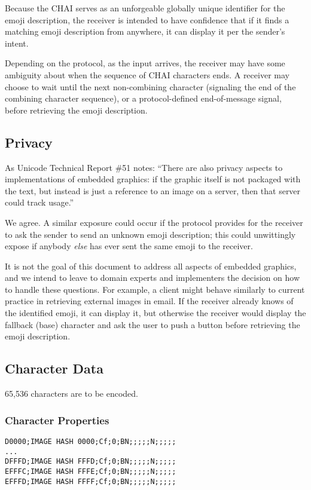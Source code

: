 \documentclass[12pt]{article}
\begin{document}
Because the CHAI serves as an unforgeable globally unique identifier
for the emoji description, the receiver is intended to have confidence
that if it finds a matching emoji description from anywhere, it can
display it per the sender's intent.

Depending on the protocol, as the input arrives, the receiver may have
some ambiguity about when the sequence of CHAI characters ends.  A
receiver may choose to wait until the next non-combining character
(signaling the end of the combining character sequence), or a
protocol-defined end-of-message signal, before retrieving the emoji
description.

\subsection{Privacy}

As Unicode Technical Report \#51 notes: ``There are also privacy
aspects to implementations of embedded graphics: if the graphic itself
is not packaged with the text, but instead is just a reference to an
image on a server, then that server could track usage.''

We agree. A similar exposure could occur if the protocol provides
for the receiver to ask the sender to send an unknown emoji description;
this could unwittingly expose if anybody \emph{else} has ever sent the same
emoji to the receiver.

It is not the goal of this document to address all aspects of embedded
graphics, and we intend to leave to domain experts and implementers
the decision on how to handle these questions. For example, a client
might behave similarly to current practice in retrieving external
images in email. If the receiver already knows of the identified
emoji, it can display it, but otherwise the receiver would display the
fallback (base) character and ask the user to push a button before
retrieving the emoji description.

\subsection{Character Data}

65,536 characters are to be encoded.

\subsubsection{Character Properties}

\begin{verbatim}
D0000;IMAGE HASH 0000;Cf;0;BN;;;;;N;;;;;
...
DFFFD;IMAGE HASH FFFD;Cf;0;BN;;;;;N;;;;;
EFFFC;IMAGE HASH FFFE;Cf;0;BN;;;;;N;;;;;
EFFFD;IMAGE HASH FFFF;Cf;0;BN;;;;;N;;;;;
\end{verbatim}
\end{document}

